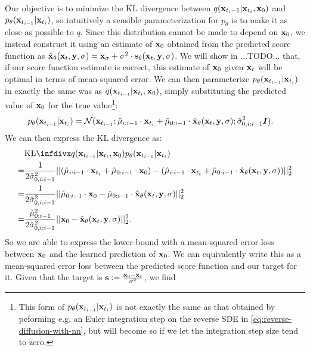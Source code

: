 Our objective is to minimize the KL divergence between $q({\mathbf{x}}_{t_i-1}|{\mathbf{x}}_{t_i},{\mathbf{x}}_0)$ and $p_\theta({\mathbf{x}}_{t_{i-1}}|{\mathbf{x}}_{t_i})$, so intuitively a sensible parameterization for $p_\theta$ is to make it as close as possible to $q$. Since this distribution cannot be made to depend on ${\mathbf{x}}_0$, we instead construct it using an estimate of ${\mathbf{x}}_0$ obtained from the predicted score function as $\hat{{\mathbf{x}}}_\theta({\mathbf{x}}_t, {\mathbf{y}}, \sigma) = {\mathbf{x}}_\sigma + \sigma^2 \cdot {\mathbf{s}}_\theta({\mathbf{x}}_t, {\mathbf{y}}, \sigma)$. 
We will show in ...TODO... that, if our score function estimate is correct, this estimate of ${\mathbf{x}}_0$ given ${\mathbf{x}}_t$ will be optimal in terms of mean-squared error.
We can then parameterize $p_\theta({\mathbf{x}}_{t_{i-1}} | {\mathbf{x}}_{t_i})$ in exactly the same was as $q({\mathbf{x}}_{t_{i-1}} | {\mathbf{x}}_{t_i},{\mathbf{x}}_0)$, simply substituting the predicted value of ${\mathbf{x}}_0$ for the true value\footnote{This form of $p_\theta({\mathbf{x}}_{t_{i-1}} | {\mathbf{x}}_{t_i})$ is not exactly the same as that obtained by peforming e.g. an Euler integration step on the reverse SDE in \cref{eq:reverse-diffusion-with-nn}, but will become so if we let the integration step size tend to zero. }:
\begin{align}
    p_\theta({\mathbf{x}}_{t_{i-1}} | {\mathbf{x}}_{t_i}) &= {\mathcal{N}}( {\mathbf{x}}_{t_{i-1}}; \hat{\mu}_{i:i-1} \cdot {\mathbf{x}}_{t_i} + \hat{\mu}_{0:i-1} \cdot \hat{{\mathbf{x}}}_\theta({\mathbf{x}}_t, {\mathbf{y}}, \sigma); \hat{\sigma}_{0,i:i-1}^2 {\bm{I}} ).
\end{align}
We can then express the KL divergence as:
\begin{align}
    &\kl{q(\rvx_{t_{i-1}} | \rvx_{t_i}, \rvx_0)}{p_\theta(\rvx_{t_{i-1}} | \rvx_{t_i})} \\ 
    = &\frac{1}{2 \hat{\sigma}_{0,i:i-1}^2} || (\hat{\mu}_{i:i-1} \cdot \rvx_{t_i} + \hat{\mu}_{0:i-1} \cdot \rvx_0) - (\hat{\mu}_{i:i-1} \cdot \rvx_{t_i} + \hat{\mu}_{0:i-1} \cdot \hat{\rvx}_\theta(\rvx_t, \rvy, \sigma)) ||_2^2 \\
    = &\frac{1}{2 \hat{\sigma}_{0,i:i-1}^2} || \hat{\mu}_{0:i-1} \cdot \rvx_0 - \hat{\mu}_{0:i-1} \cdot \hat{\rvx}_\theta(\rvx_t, \rvy, \sigma) ||_2^2 \\
    = &\frac{\hat{\mu}_{0:i-1}^2}{2 \hat{\sigma}_{0,i:i-1}^2} || \rvx_0 - \hat{\rvx}_\theta(\rvx_t, \rvy, \sigma) ||_2^2.
\end{align}
So we are able to express the lower-bound with a mean-squared error loss between ${\mathbf{x}}_0$ and the learned prediction of ${\mathbf{x}}_0$. We can equivalently write this as a mean-squared error loss between the predicted score function and our target for it. Given that the target is ${\mathbf{s}} := \frac{{\mathbf{x}}_0 - {\mathbf{x}}_t}{\sigma^2}$, we find
